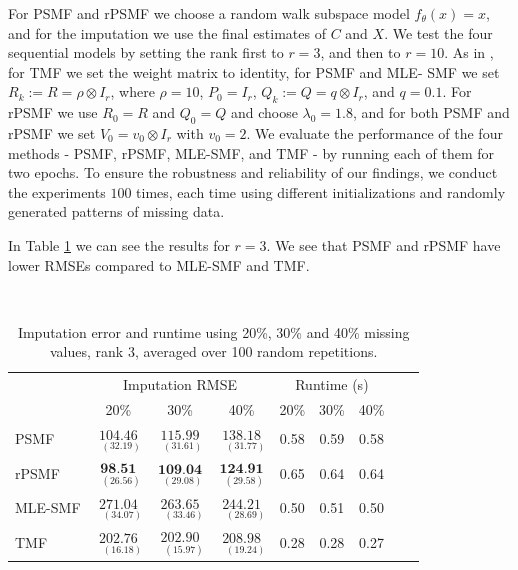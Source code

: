 \documentclass{mldsmsc}
\begin{document}
\noindent For PSMF and rPSMF we choose a random walk subspace model $f_{\theta}(x) = x$, and for the imputation we use the final estimates of $C$ and $X$. We test the four sequential models by setting the rank first to $r = 3$, and then to $r = 10$. As in \cite{akyildiz2021probabilistic}, for TMF we set the weight matrix to identity, for PSMF and MLE- SMF we set $R_k := R = \rho \otimes I_r$, where $\rho = 10$, $P_0 = I_r$, $Q_k := Q = q \otimes I_r$, and $q = 0.1$. For rPSMF we use $R_0 = R$ and $Q_0 = Q$ and choose $\lambda_0 = 1.8$, and for both PSMF and rPSMF we set $V_0 = v_0 \otimes I_r$ with $v_0 = 2$. We evaluate the performance of the four methods - PSMF, rPSMF, MLE-SMF, and TMF - by running each of them for two epochs. To ensure the robustness and reliability of our findings, we conduct the experiments $100$ times, each time using different initializations and randomly generated patterns of missing data. \newline

\noindent In Table \ref{tab:rmse3} we can see the results for $r = 3$. We see that PSMF and rPSMF have lower RMSEs compared to MLE-SMF and TMF.  \newline

\begin{table}[H]
\centering
\label{tab:rmse3}
 \\[0.5ex]
\begin{tabular}{@{}lccc|ccccc@{}}
\toprule
 & \multicolumn{3}{c}{Imputation RMSE} & \multicolumn{3}{c}{Runtime (s)} \\
 & 20\% & 30\% & 40\% & 20\% & 30\% & 40\% \\
\midrule
PSMF & $\underset{{\scriptscriptstyle \;\;(32.19)}}{104.46}$ & $\underset{{\scriptscriptstyle \;\;(31.61)}}{115.99}$ & $\underset{{\scriptscriptstyle \;\;\;(31.77)}}{138.18}$ & 0.58 & 0.59 & 0.58 \\
rPSMF & $\underset{{\scriptscriptstyle \;\;(26.56)}}{\textbf{98.51}}$ & $\underset{{\scriptscriptstyle \;\;(29.08)}}{\textbf{109.04}}$ & $\underset{{\scriptscriptstyle \;\;(29.58)}}{\textbf{124.91}}$ & 0.65 & 0.64 & 0.64 \\
MLE-SMF & $\underset{{\scriptscriptstyle \;\;\;(34.07)}}{271.04}$ & $\underset{{\scriptscriptstyle \;\;\;(33.46)}}{263.65}$ & $\underset{{\scriptscriptstyle \;\;\;(28.69)}}{244.21}$ & 0.50 & 0.51 & 0.50 \\
TMF & $\underset{{\scriptscriptstyle \;\;\;(16.18)}}{202.76}$ & $\underset{{\scriptscriptstyle \;\;\;(15.97)}}{202.90}$ & $\underset{{\scriptscriptstyle \;\;\;(19.24)}}{208.98}$ & 0.28 & 0.28 & 0.27 \\
\bottomrule
\end{tabular}
\caption{Imputation error and runtime using 20\%, 30\% and 40\% missing values, rank 3, averaged over 100 random repetitions.}
\end{table}
\end{document}
